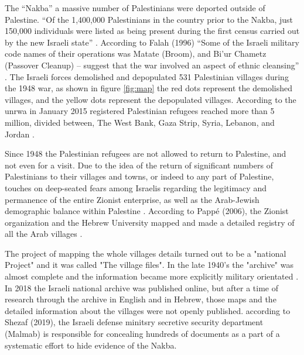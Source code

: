 The “Nakba” a massive number of Palestinians were deported outside of Palestine. “Of the
1,400,000 Palestinians in the country prior to the Nakba, just 150,000 individuals were listed
as being present during the first census carried out by the new Israeli state” \citep{Sanbar2007}.
According to Falah (1996) “Some of the Israeli military code names of their operations was
Matate (Broom), and Bi’ur Chametz (Passover Cleanup) – suggest that the war involved an
aspect of ethnic cleansing” \citep{Falah1996}\citep{Pappe2006}. The Israeli forces demolished and depopulated 531
Palestinian villages during the 1948 war, as shown in figure \ref{fig:map} the red dots represent the demolished villages, and the yellow dots represent the depopulated villages. According to the \acrshort{unrwa} in January 2015 registered
Palestinian refugees reached more than 5 million, divided between, The West Bank, Gaza
Strip, Syria, Lebanon, and Jordan \citep{DajaniDaoudi2011}. 

Since 1948 the Palestinian refugees are not allowed to return to Palestine, and not even for a visit. Due to the idea of the return of significant numbers of Palestinians to their villages and towns, or indeed to any part of Palestine, touches on deep-seated fears among Israelis regarding the legitimacy and permanence of the entire Zionist enterprise, as well as the Arab-Jewish demographic balance within Palestine \citep{Khalidi2016}. According to Pappé (2006), the Zionist organization and the Hebrew University mapped and made a detailed registry of all the Arab villages \citep{Pappe2006}.



The project of mapping the whole villages details turned out to be a "national Project" and it was called "The village files"\citep{Pappe2006}. In the late 1940's the "archive" was almost complete and the information became more explicitly military orientated \citep{Pappe2006}. In 2018 the Israeli national archive was published online, but after a time of research through the archive in English and in Hebrew, those maps and the detailed information about the villages were not openly published. according to Shezaf (2019), the Israeli defense minitsry secretive security department (Malmab) is responsible for concealing hundreds of documents as a part of a systematic effort to hide evidence of the Nakba.

